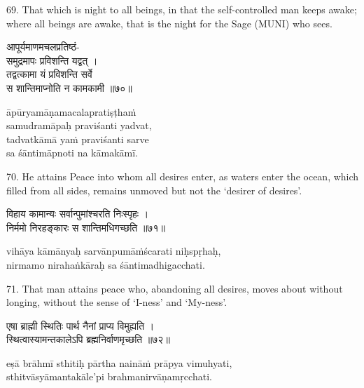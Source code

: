 69. That which is night to all beings, in that the self-controlled man keeps
awake; where all beings are awake, that is the night for the Sage (MUNI) who
sees.

\begin{gitaverse}
आपूर्यमाणमचलप्रतिष्ठं- \\
\tab समुद्रमापः प्रविशन्ति यद्वत् । \\
तद्वत्कामा यं प्रविशन्ति सर्वे \\
\tab स शान्तिमाप्नोति न कामकामी ॥७०॥
\end{gitaverse}

\begin{transliteration}
āpūryamāṇamacalapratiṣṭhaṁ \\
\tab samudramāpaḥ praviśanti yadvat, \\
tadvatkāmā yaṁ praviśanti sarve \\
\tab sa śāntimāpnoti na kāmakāmī.
\end{transliteration}

70. He attains Peace into whom all desires enter, as waters enter the ocean,
which filled from all sides, remains unmoved but not the `desirer of desires'.

\begin{gitaverse}
विहाय कामान्यः सर्वान्पुमांश्चरति निःस्पृहः । \\
निर्ममो निरहङ्कारः स शान्तिमधिगच्छति ॥७१॥
\end{gitaverse}

\begin{transliteration}
vihāya kāmānyaḥ sarvānpumāṁścarati niḥspṛhaḥ, \\
nirmamo nirahaṅkāraḥ sa śāntimadhigacchati.
\end{transliteration}

71. That man attains peace who, abandoning all desires, moves about without
longing, without the sense of `I-ness' and `My-ness'.

\begin{gitaverse}
एषा ब्राह्मी स्थितिः पार्थ नैनां प्राप्य विमुह्यति । \\
स्थित्वास्यामन्तकालेऽपि ब्रह्मनिर्वाणमृच्छति ॥७२॥
\end{gitaverse}

\begin{transliteration}
eṣā brāhmī sthitiḥ pārtha naināṁ prāpya vimuhyati, \\
sthitvāsyāmantakāle'pi brahmanirvāṇamṛcchati.
\end{transliteration}

